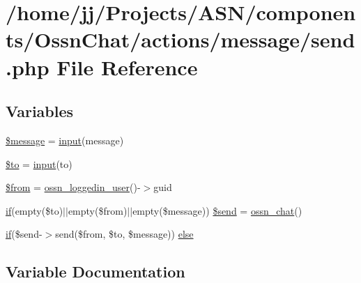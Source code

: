 \hypertarget{_ossn_chat_2actions_2message_2send_8php}{}\section{/home/jj/\+Projects/\+A\+S\+N/components/\+Ossn\+Chat/actions/message/send.php File Reference}
\label{_ossn_chat_2actions_2message_2send_8php}
\subsection*{Variables}
\begin{DoxyCompactItemize}
\item 
\hyperlink{_ossn_chat_2actions_2message_2send_8php_abf17cb2dba2ed17cb28aa5f37deb5293}{\$message} = \hyperlink{ossn_8lib_8input_8php_a64ebee98b041c4f75f71ed3cd73cc8ed}{input}(\textquotesingle{}message\textquotesingle{})
\item 
\hyperlink{_ossn_chat_2actions_2message_2send_8php_ac19f839b525d6d99d063fe56bf2a6d3b}{\$to} = \hyperlink{ossn_8lib_8input_8php_a64ebee98b041c4f75f71ed3cd73cc8ed}{input}(\textquotesingle{}to\textquotesingle{})
\item 
\hyperlink{_ossn_chat_2actions_2message_2send_8php_a0bb7e2b3d541598cc9c9e3b11bee859c}{\$from} = \hyperlink{ossn_8lib_8users_8php_aa3c8068d0e6638b414d6a2f6c62565b8}{ossn\+\_\+loggedin\+\_\+user}()-\/$>$guid
\item 
\hyperlink{jquery_8tokeninput_8js_ad8dd46a3cbc004569e34401e9e71771a}{if}(empty(\$to)$\vert$$\vert$empty(\$from)$\vert$$\vert$empty(\$message)) \hyperlink{_ossn_chat_2actions_2message_2send_8php_adf45c16f44cc0796d52c418c0411ae82}{\$send} = \hyperlink{ossn_8lib_8chat_8php_adfe2d47e3e6a6825beb8e3b9c8d4c6dd}{ossn\+\_\+chat}()
\item 
\hyperlink{jquery_8tokeninput_8js_ad8dd46a3cbc004569e34401e9e71771a}{if}(\$send-\/$>$send(\$from, \$to, \$message)) \hyperlink{_ossn_chat_2actions_2message_2send_8php_a2dcf5bd0c75a4044cdcfb8474e5967dd}{else}
\end{DoxyCompactItemize}


\subsection{Variable Documentation}
